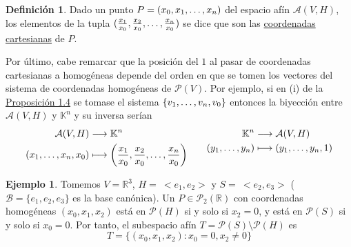 \documentclass[12pt]{report}
\theoremstyle{definition}
\newtheorem{definition}{Definición}[chapter]
\theoremstyle{definition}
\newtheorem{example}{Ejemplo}[chapter]
\theoremstyle{remark}
\newcommand{\R}{\mathbb R}
\begin{document}
\begin{definition}
Dado un punto $P = (x_0,x_1,\mathellipsis,x_n)$ del espacio afín $\mathcal{A}(V,H)$, los elementos de la tupla $(\frac{x_1}{x_0},\frac{x_2}{x_0},\mathellipsis,\frac{x_n}{x_0})$ se dice que son las \ul{coordenadas cartesianas} de $P$.
\end{definition}
Por último, cabe remarcar que la posición del $1$ al pasar de coordenadas cartesianas a homogéneas depende del orden en que se tomen los vectores del sistema de coordenadas homogéneas de $\mathcal{P}(V)$. Por ejemplo, si en (i) de la \hyperref[prop1.3.]{\color{blue}Proposición 1.4} se tomase el sistema $\{v_1,\mathellipsis,v_n,v_0\}$ entonces la biyección entre $\mathcal{A}(V,H)$ y $\mathbb{K}^n$ y su inversa serían
\begin{equation*}
\begin{aligned}[t]
    \mathcal{A}(V,H) &\longrightarrow \mathbb{K}^n \\
    (x_1,\mathellipsis,x_n,x_0) &\longmapsto \biggl(\frac{x_1}{x_0},\frac{x_2}{x_0},\mathellipsis,\frac{x_n}{x_0}\biggr)
\end{aligned}
\qquad
\begin{aligned}[t]
    \mathbb{K}^n &\longrightarrow \mathcal{A}(V,H) \\
    (y_1,\mathellipsis,y_n) &\longmapsto (y_1,\mathellipsis,y_n,1)
\end{aligned}
\end{equation*}

\begin{example}
Tomemos $V = \R^3$, $H = \ <e_1,e_2>$ y $S = \ <e_2,e_3>$ ($\mathcal{B} = \{e_1,e_2,e_3\}$ es la base canónica). Un $P \in \mathcal{P}_2(\R)$ con coordenadas homogéneas $(x_0,x_1,x_2)$ está en $\mathcal{P}(H)$ si y solo si $x_2 = 0$, y está en $\mathcal{P}(S)$ si y solo si $x_0 = 0$. Por tanto, el subespacio afín $T = \mathcal{P}(S) \setminus \mathcal{P}(H)$ es
\[T = \{(x_0,x_1,x_2) \colon x_0 = 0, x_2 \neq 0\}\]
\end{example}
\end{document}

